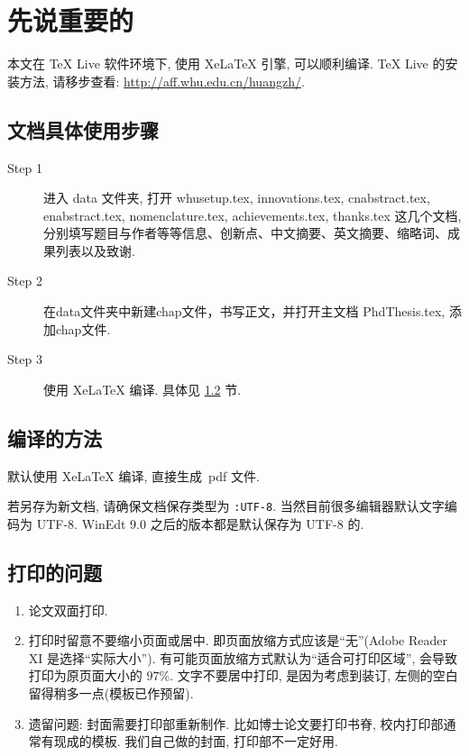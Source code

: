 \chapter{先说重要的}

本文在 TeX Live 软件环境下, 使用 XeLaTeX 引擎, 可以顺利编译.
TeX Live 的安装方法, 请移步查看: \url{http://aff.whu.edu.cn/huangzh/}.


\section{文档具体使用步骤}

\begin{description}
  \item[Step 1]  进入 data 文件夹,  打开 whusetup.tex, innovations.tex,  cnabstract.tex,  enabstract.tex, nomenclature.tex, achievements.tex, thanks.tex 这几个文档,分别填写题目与作者等等信息、创新点、中文摘要、英文摘要、缩略词、成果列表以及致谢.

  \item[Step 2]  在data文件夹中新建chap文件，书写正文，并打开主文档 PhdThesis.tex, 添加chap文件.

  \item[Step 3]  使用 XeLaTeX{} 编译. 具体见 \cref{sec-compile} 节.

\end{description}


\section{编译的方法}\label{sec-compile}

默认使用 XeLaTeX 编译, 直接生成~pdf 文件.

若另存为新文档, 请确保文档保存类型为 \verb|:UTF-8|. 当然目前很多编辑器默认文字编码为 UTF-8.
WinEdt 9.0 之后的版本都是默认保存为 UTF-8 的.


\section{打印的问题}
\begin{enumerate}[label=(\arabic*)]
  \item  论文双面打印.
  \item  打印时留意不要缩小页面或居中. 即页面放缩方式应该是``无''(Adobe Reader XI 是选择``实际大小'').
           有可能页面放缩方式默认为``适合可打印区域'', 会导致打印为原页面大小的 $97\%$.
           文字不要居中打印, 是因为考虑到装订, 左侧的空白留得稍多一点(模板已作预留).
  \item  遗留问题: 封面需要打印部重新制作. 比如博士论文要打印书脊, 校内打印部通常有现成的模板.
           我们自己做的封面, 打印部不一定好用.
\end{enumerate}




